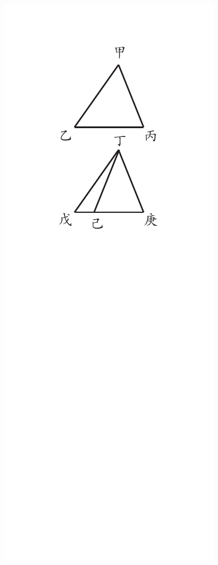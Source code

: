 \documentclass[12pt,b5paper,landscape]{article}
\begin{document}
\begin{multicols}{2}
\begin{center}
    \includegraphics[angle=90]{eu70b}


\end{center}
\end{multicols}
\end{document}
